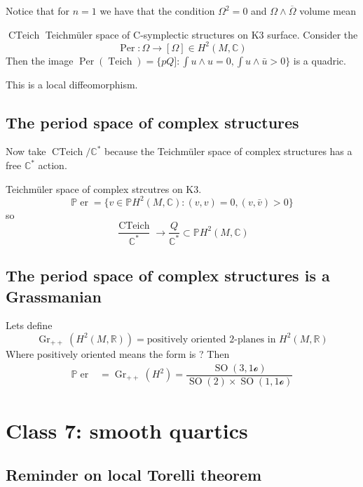 Notice that for $n=1$ we have that the condition $\Omega^2=0$ and $\Omega\wedge \overline{\Omega}$ volume mean


\begin{thm}\leavevmode
	$\operatorname{CTeich}$ Teichm\"uler space of C-symplectic structures on K3 surface. Consider the
	\[\operatorname{Per}:\Omega\to [\Omega]\in H^{2}(M,\mathbb{C})\]
	Then the image $\operatorname{Per}(\operatorname{Teich})=\{pQ]:\int u\wedge  u=0, \int u\wedge  \bar{u}>0\}$ is a quadric.

	This is a local diffeomorphism.
	
\end{thm}

\subsection{The period space of complex structures}

Now take $\operatorname{CTeich}/\mathbb{C}^*$ because the Teichm\"uler space of complex structures has a free $\mathbb{C}^*$ action.


\begin{prop}
	Teichm\"uler space of complex strcutres on K3.
	\[\mathbb{P}\operatorname{er}=\{v\in\mathbb{P}H^{2}(M,\mathbb{C}):(v,v)=0,(v,\bar{v})>0\}\]
	so
	\[\frac{\operatorname{CTeich}}{\mathbb{C}^*}\longrightarrow \frac{Q}{\mathbb{C}^*}\subset \mathbb{P}H^{2}(M,\mathbb{C})\]
\end{prop}

\subsection{The period space of complex structures is a Grassmanian}

Lets define
\[\operatorname{Gr}_{++}(H^{2}(M,\mathbb{R}))=\text{positively oriented 2-planes in }H^{2}(M,\mathbb{R}) \]
Where positively oriented means the form is ? Then
\begin{align*}
\mathbb{P}\operatorname{er}&=\operatorname{Gr}_{++}(H^{2})=\dfrac{\operatorname{SO}(3,1\mathcal{o})}{\operatorname{SO}(2) \times \operatorname{SO}(1,1\mathcal{o})}
\end{align*}

\section{Class 7: smooth quartics}

\subsection{Reminder on local Torelli theorem}

